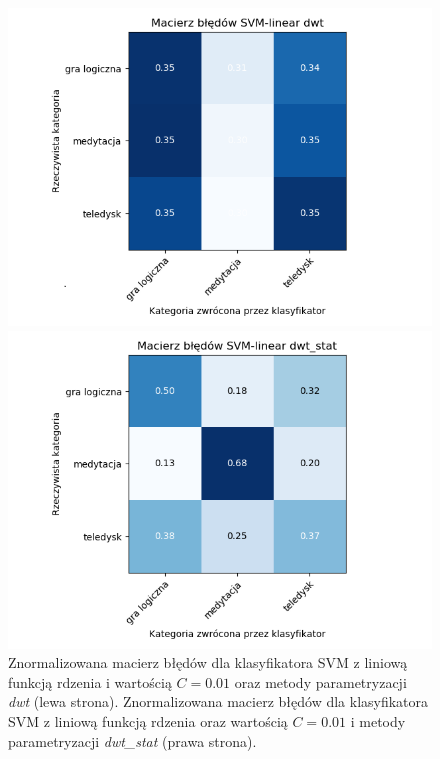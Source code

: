\documentclass[notitlepage]{report}
\begin{document}
\begin{figure}[H]
	\begin{minipage}{0.48\textwidth}
		\centering
		\includegraphics[width=1.3\linewidth]{linear_svm_dwt_cm2.png}
	\end{minipage}
	\begin{minipage}{0.48\textwidth}
		\centering
		\includegraphics[width=1.3\linewidth]{linear_svm_dwt_2_cm2.png}
	\end{minipage}
	\caption{Znormalizowana macierz błędów dla klasyfikatora SVM z liniową funkcją rdzenia i wartością $C=0.01$ oraz metody parametryzacji \textit{dwt} (lewa strona). Znormalizowana macierz błędów dla klasyfikatora SVM z liniową funkcją rdzenia oraz wartością $C=0.01$ i metody parametryzacji \textit{dwt\_stat} (prawa strona).}
\end{figure}
\end{document}

